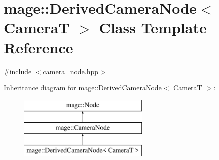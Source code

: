 \hypertarget{classmage_1_1_derived_camera_node}{}\section{mage\+:\+:Derived\+Camera\+Node$<$ CameraT $>$ Class Template Reference}
\label{classmage_1_1_derived_camera_node}


{\ttfamily \#include $<$camera\+\_\+node.\+hpp$>$}

Inheritance diagram for mage\+:\+:Derived\+Camera\+Node$<$ CameraT $>$\+:\begin{figure}[H]
\begin{center}
\leavevmode
\includegraphics[height=3.000000cm]{classmage_1_1_derived_camera_node}
\end{center}
\end{figure}
